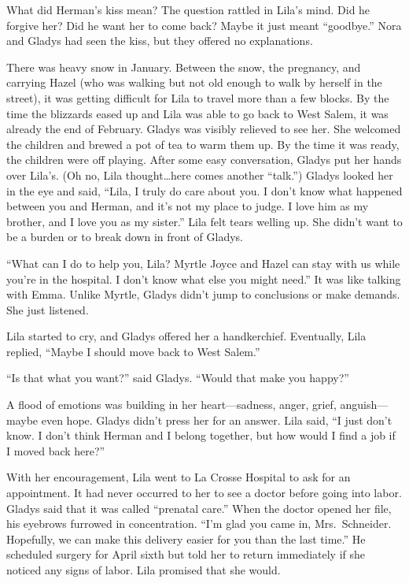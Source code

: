 \documentclass[
  letterpaper,
]{book}
\begin{document}
What did Herman's kiss mean? The question rattled in Lila's mind. Did he
forgive her? Did he want her to come back? Maybe it just meant
``goodbye.'' Nora and Gladys had seen the kiss, but they offered no
explanations.

There was heavy snow in January. Between the snow, the pregnancy, and
carrying Hazel (who was walking but not old enough to walk by herself in
the street), it was getting difficult for Lila to travel more than a few
blocks. By the time the blizzards eased up and Lila was able to go back
to West Salem, it was already the end of February. Gladys was visibly
relieved to see her. She welcomed the children and brewed a pot of tea
to warm them up. By the time it was ready, the children were off
playing. After some easy conversation, Gladys put her hands over Lila's.
(Oh no, Lila thought\ldots here comes another ``talk.'') Gladys looked
her in the eye and said, ``Lila, I truly do care about you. I don't know
what happened between you and Herman, and it's not my place to judge. I
love him as my brother, and I love you as my sister.'' Lila felt tears
welling up. She didn't want to be a burden or to break down in front of
Gladys.

``What can I do to help you, Lila? Myrtle Joyce and Hazel can stay with
us while you're in the hospital. I don't know what else you might
need.'' It was like talking with Emma. Unlike Myrtle, Gladys didn't jump
to conclusions or make demands. She just listened.

Lila started to cry, and Gladys offered her a handkerchief. Eventually,
Lila replied, ``Maybe I should move back to West Salem.''

``Is that what you want?'' said Gladys. ``Would that make you happy?''

A flood of emotions was building in her heart---sadness, anger, grief,
anguish---maybe even hope. Gladys didn't press her for an answer. Lila
said, ``I just don't know. I don't think Herman and I belong together,
but how would I find a job if I moved back here?''

With her encouragement, Lila went to La Crosse Hospital to ask for an
appointment. It had never occurred to her to see a doctor before going
into labor. Gladys said that it was called ``prenatal care.'' When the
doctor opened her file, his eyebrows furrowed in concentration. ``I'm
glad you came in, Mrs.~Schneider. Hopefully, we can make this delivery
easier for you than the last time.'' He scheduled surgery for April
sixth but told her to return immediately if she noticed any signs of
labor. Lila promised that she would.
\end{document}
